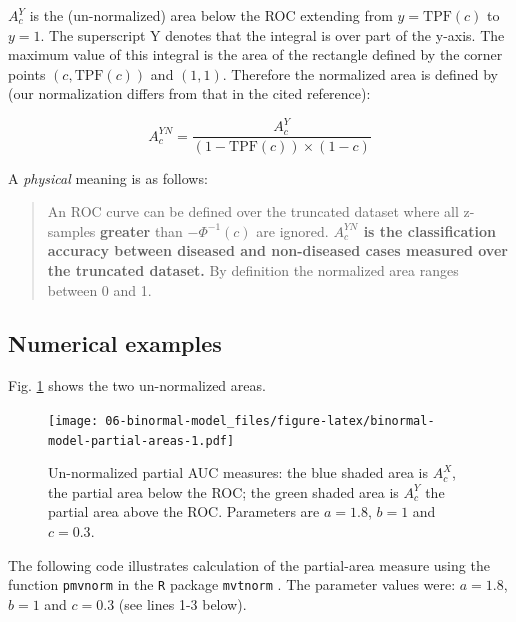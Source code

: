 \documentclass[
]{book}
\begin{document}
\(A_c^{Y}\) is the (un-normalized) area below the ROC extending from \(y = \text{TPF}(c)\) to \(y = 1\). The superscript Y denotes that the integral is over part of the y-axis. The maximum value of this integral is the area of the rectangle defined by the corner points \((c,\text{TPF}(c))\) and \((1,1)\). Therefore the normalized area is defined by (our normalization differs from that in the cited reference):

\begin{equation}
A_c^{YN} = \frac{A_c^{Y}}{\left (1 - \text{TPF}(c)  \right ) \times \left (1-c  \right )}
\label{eq:binormal-model-normalized-partial-auc-sensitivity}
\end{equation}

A \emph{physical} meaning is as follows:

\begin{quote}
An ROC curve can be defined over the truncated dataset where all z-samples \textbf{greater} than \(-\Phi^{-1}(c)\) are ignored. \textbf{\(A_c^{YN}\) is the classification accuracy between diseased and non-diseased cases measured over the truncated dataset.} By definition the normalized area ranges between 0 and 1.
\end{quote}

\hypertarget{binormal-model-metz-partial-auc-example}{%
\subsection{Numerical examples}\label{binormal-model-metz-partial-auc-example}}

Fig. \ref{fig:binormal-model-partial-areas} shows the two un-normalized areas.

\begin{figure}
\centering
\texttt{[image: 06-binormal-model\_files/figure-latex/binormal-model-partial-areas-1.pdf]}
\caption{\label{fig:binormal-model-partial-areas}Un-normalized partial AUC measures: the blue shaded area is \(A_c^{X}\), the partial area below the ROC; the green shaded area is \(A_c^{Y}\) the partial area above the ROC. Parameters are \(a = 1.8\), \(b = 1\) and \(c = 0.3\).}
\end{figure}

The following code illustrates calculation of the partial-area measure using the function \texttt{pmvnorm} in the \texttt{R} package \texttt{mvtnorm} \citep{R-mvtnorm}. The parameter values were: \(a = 1.8\), \(b = 1\) and \(c = 0.3\) (see lines 1-3 below).
\end{document}
